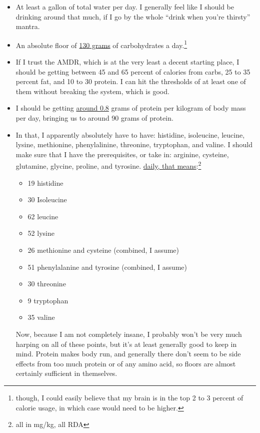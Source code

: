 \documentclass[12pt]{article}[titlepage]
\newcommand{\say}[1]{``#1''}
\renewcommand{\,}{\textsuperscript{,}}
\begin{document}
\begin{itemize}  
\item At least a gallon of total water per day. I generally feel like I should be drinking around that much, if I go by the whole \say{drink when you're thirsty} mantra.  
\item An absolute floor of \href{https://nap.nationalacademies.org/read/11537/chapter/10}{130 grams} of carbohydrates a day.\footnote{though, I could easily believe that my brain is in the top 2 to 3 percent of calorie usage, in which case would need to be higher.}  
\item If I trust the AMDR, which is at the very least a decent starting place, I should be getting between 45 and 65 percent of calories from carbs, 25 to 35 percent fat, and 10 to 30 protein. I can hit the thresholds of at least one of them without breaking the system, which is good.  
\item I should be getting \href{https://nap.nationalacademies.org/read/11537/chapter/14}{around 0.8} grams of protein per kilogram of body mass per day, bringing us to around 90 grams of protein.  
\item In that, I apparently absolutely have to have: histidine, isoleucine, leucine, lysine, methionine, phenylalinine, threonine, tryptophan, and valine. I should make sure that I have the prerequisites, or take in: arginine, cysteine, glutamine, glycine, proline, and tyrosine. \href{https://nap.nationalacademies.org/read/11537/chapter/53#464}{daily, that means}:\footnote{all in mg/kg, all RDA}  
\begin{itemize}  
\item 19 histidine  
\item 30 Isoleucine  
\item 62 leucine  
\item 52 lysine  
\item 26 methionine and cysteine (combined, I assume)  
\item 51 phenylalanine and tyrosine (combined, I assume)  
\item 30 threonine  
\item 9 tryptophan  
\item 35 valine  
\end{itemize}
Now, because I am not completely insane, I probably won't be very much harping on all of these points, but it's at least generally good to keep in mind. Protein makes body run, and generally there don't seem to be side effects from too much protein or of any amino acid, so floors are almost certainly sufficient in themselves.  

\end{itemize}
\end{document}
